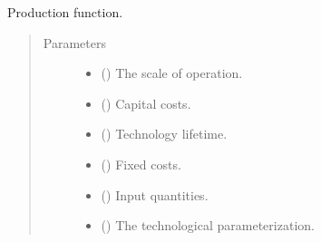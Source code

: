 \documentclass[letterpaper,10pt,english]{sphinxmanual}
\begin{document}
\begin{fulllineitems}
\label{\detokenize{technology:technology.pv_residential_large.production}}
Production function.
\begin{quote}\begin{description}
\item[{Parameters}] \leavevmode\begin{itemize}
\item {} 
 () \textendash{} The scale of operation.

\item {} 
 () \textendash{} Capital costs.

\item {} 
 () \textendash{} Technology lifetime.

\item {} 
 () \textendash{} Fixed costs.

\item {} 
 () \textendash{} Input quantities.

\item {} 
 () \textendash{} The technological parameterization.

\end{itemize}

\end{description}\end{quote}

\end{fulllineitems}

\end{document}
